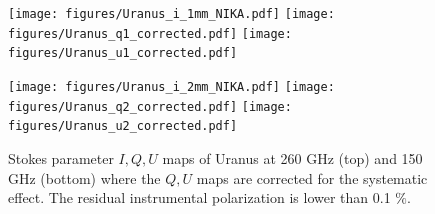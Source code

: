 \documentclass[twocolumn,traditabstract]{aa}
\begin{document}
 \begin{figure}
  \begin{center}
  \texttt{[image: figures/Uranus\_i\_1mm\_NIKA.pdf]}
   \texttt{[image: figures/Uranus\_q1\_corrected.pdf]}
    \texttt{[image: figures/Uranus\_u1\_corrected.pdf]}
  \end{center}
  \end{figure}
  
 \begin{figure}
  \begin{center}
   \texttt{[image: figures/Uranus\_i\_2mm\_NIKA.pdf]}
   \texttt{[image: figures/Uranus\_q2\_corrected.pdf]}
    \texttt{[image: figures/Uranus\_u2\_corrected.pdf]}
  \caption{ Stokes parameter $I, Q, U$ maps of Uranus at 260 GHz (top) and 150 GHz (bottom) where the $Q,U$ maps are corrected for the systematic effect. The residual instrumental polarization is lower than 0.1 $\%$.}
  \label{Uranus_corrected}
  \end{center}
  \end{figure}
\end{document}
